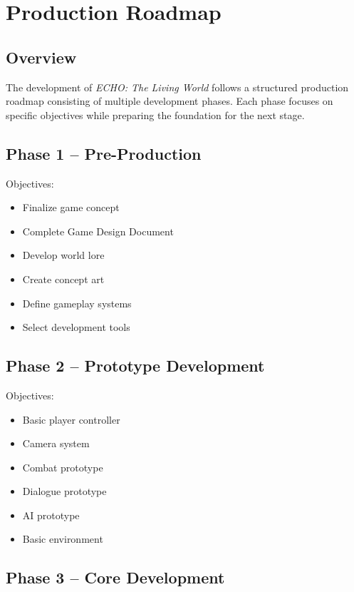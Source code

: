 \chapter{Production Roadmap}

\section{Overview}

The development of \textit{ECHO: The Living World} follows a structured production roadmap consisting of multiple development phases. Each phase focuses on specific objectives while preparing the foundation for the next stage.

\section{Phase 1 -- Pre-Production}

Objectives:

\begin{itemize}
    \item Finalize game concept
    \item Complete Game Design Document
    \item Develop world lore
    \item Create concept art
    \item Define gameplay systems
    \item Select development tools
\end{itemize}

\section{Phase 2 -- Prototype Development}

Objectives:

\begin{itemize}
    \item Basic player controller
    \item Camera system
    \item Combat prototype
    \item Dialogue prototype
    \item AI prototype
    \item Basic environment
\end{itemize}

\section{Phase 3 -- Core Development}

